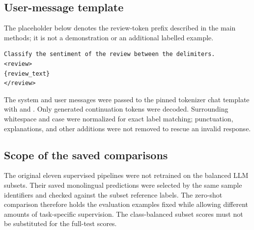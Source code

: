 \subsection{User-message template}
The placeholder below denotes the review-token prefix described in the main methods; it is not a demonstration or an additional labelled example.
\begin{verbatim}
Classify the sentiment of the review between the delimiters.
<review>
{review_text}
</review>
\end{verbatim}

The system and user messages were passed to the pinned tokenizer chat template with  and . Only generated continuation tokens were decoded. Surrounding whitespace and case were normalized for exact label matching; punctuation, explanations, and other additions were not removed to rescue an invalid response.

\subsection{Scope of the saved comparisons}
The original eleven supervised pipelines were not retrained on the balanced LLM subsets. Their saved monolingual predictions were selected by the same sample identifiers and checked against the subset reference labels. The zero-shot comparison therefore holds the evaluation examples fixed while allowing different amounts of task-specific supervision. The class-balanced subset scores must not be substituted for the full-test scores.
